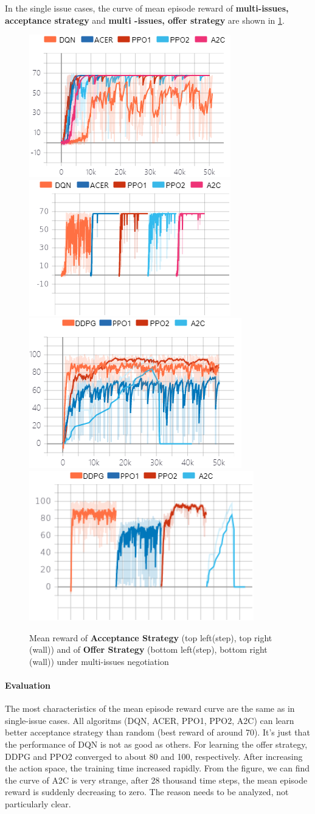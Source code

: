 In the single issue cases, the curve of mean episode reward of \textbf{multi-issues, acceptance strategy} and \textbf{multi -issues, offer strategy} are shown in \ref{fig:multi-issues}. 
\begin{figure}
    \includegraphics[width=.40\textwidth]{./images/ac_s_multi_issues.png}\hfill
    \includegraphics[width=.40\textwidth]{./images/ac_s_multi_issues_wall.png}
    \\[\smallskipamount]
    \includegraphics[width=.40\textwidth]{./images/of_s_multi_issues.png}\hfill
    \includegraphics[width=.40\textwidth]{./images/of_s_multi_issues_wall.png}
    \caption{Mean reward of \textbf{Acceptance Strategy} (top left(step), top right (wall)) and of \textbf{Offer Strategy} (bottom left(step), bottom right (wall)) under multi-issues negotiation}
		\label{fig:multi-issues}
\end{figure}

\paragraph{Evaluation} The most characteristics of the mean episode reward curve are the same as in single-issue cases. All algoritms (DQN, ACER, PPO1, PPO2, A2C) can learn better acceptance strategy than random (best reward of around 70). It's just that the performance of DQN is not as good as others. For learning the offer strategy, DDPG and PPO2 converged to about 80 and 100, respectively. After increasing the action space, the training time increased rapidly. From the figure, we can find the curve of A2C is very strange, after 28 thousand time steps, the mean episode reward is suddenly decreasing to zero. The reason needs to be analyzed, not particularly clear.

